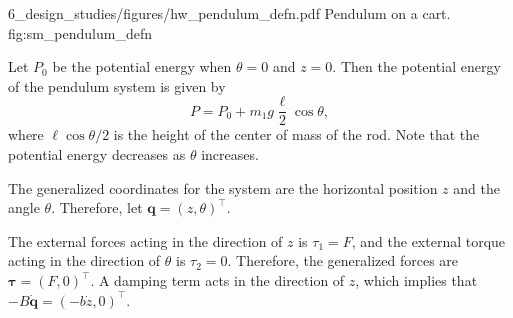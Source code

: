 
	{6_design_studies/figures/hw_pendulum_defn.pdf}
	{Pendulum on a cart.}
	{fig:sm_pendulum_defn}
	


Let $P_0$ be the potential energy when $\theta=0$ and $z=0$.  Then the potential energy of the pendulum system is given by
\[
P = P_0 + m_1 g \frac{\ell}{2} \cos\theta,
\]
where $\ell\cos\theta / 2$ is the height of the center of mass of the rod.
Note that the potential energy decreases as $\theta$ increases.

The generalized coordinates for the system are the horizontal position $z$ and the angle $\theta$.  Therefore, let $\mathbf{q} = (z, \theta)^\top$.

The external forces acting in the direction of $z$ is $\tau_1 = F$, and the external torque acting in the direction of $\theta$ is $\tau_2=0$.  Therefore, the generalized forces are $\boldsymbol{\tau}=(F, 0)^\top$.  A damping term acts in the direction of $z$, which implies that
$-B\dot{\mathbf{q}} = (-b\dot{z}, 0)^\top$.

